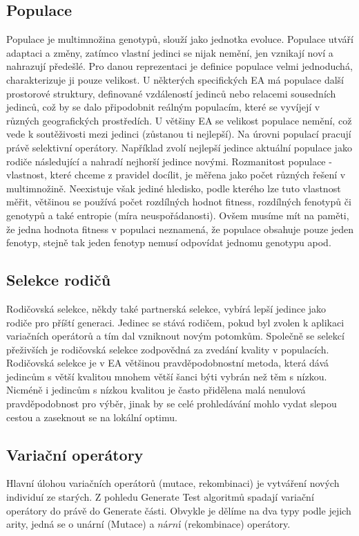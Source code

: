 \subsection*{Populace}
Populace je multimnožina genotypů, slouží jako jednotka evoluce. Populace utváří adaptaci a změny, zatímco vlastní jedinci se nijak nemění, jen vznikají noví a nahrazují předešlé. Pro danou reprezentaci je definice populace velmi jednoduchá, charakterizuje ji pouze velikost. U některých specifických EA má populace další prostorové struktury, definované vzdáleností jedinců nebo relacemi sousedních jedinců, což by se dalo připodobnit reálným populacím, které se vyvíjejí v různých geografických prostředích. U většiny EA se velikost populace nemění, což vede k soutěživosti mezi jedinci (zůstanou ti nejlepší). Na úrovni populací pracují právě selektivní operátory. Například zvolí nejlepší jedince aktuální populace jako rodiče následující a nahradí nejhorší jedince novými. Rozmanitost populace - vlastnost, které chceme z pravidel docílit, je měřena jako počet různých řešení v multimnožině. Neexistuje však jediné hledisko, podle kterého lze tuto vlastnost měřit, většinou se používá počet rozdílných hodnot fitness, rozdílných fenotypů či genotypů a také entropie (míra neuspořádanosti). Ovšem musíme mít na paměti, že jedna hodnota fitness v populaci neznamená, že populace obsahuje pouze jeden fenotyp, stejně tak jeden fenotyp nemusí odpovídat jednomu genotypu apod. 
\subsection*{Selekce rodičů}
Rodičovská selekce, někdy také partnerská selekce, vybírá lepší jedince jako rodiče pro příští generaci. Jedinec se stává rodičem, pokud byl zvolen k aplikaci variačních operátorů a tím dal vzniknout novým potomkům. Společně se selekcí přeživších je rodičovská selekce zodpovědná za zvedání kvality v populacích. Rodičovská selekce je v EA většinou pravděpodobnostní metoda, která dává jedincům s větší kvalitou mnohem větší šanci býti vybrán než těm s nízkou. Nicméně i jedincům s nízkou kvalitou je často přidělena malá nenulová pravděpodobnost pro výběr, jinak by se celé prohledávání mohlo vydat slepou cestou a zaseknout se na lokální optimu. 
\subsection*{Variační operátory}
Hlavní úlohou variačních operátorů (mutace, rekombinaci) je vytváření nových individuí ze starých. Z pohledu Generate  Test algoritmů spadají variační operátory do právě do Generate části. Obvykle je dělíme na dva typy podle jejich arity, jedná se o unární (Mutace) a $nární$ (rekombinace) operátory.
